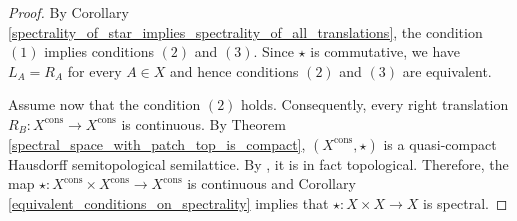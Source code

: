 \documentclass[10pt, reqno]{amsart}
\theoremstyle{plain}
\theoremstyle{definition}
\begin{document}
\begin{proof}
    By Corollary \ref{spectrality_of_star_implies_spectrality_of_all_translations}, the condition $(1)$ implies conditions $(2)$ and $(3)$. Since $\star$ is commutative, we have $L_A = R_A$ for every $A \in X$ and hence conditions $(2)$ and $(3)$ are equivalent. 

    Assume now that the condition $(2)$ holds. Consequently, every right translation $R_B: X^\mathrm{cons} \to X^\mathrm{cons}$ is continuous. By Theorem \ref{spectral_space_with_patch_top_is_compact}, $(X^\mathrm{cons}, \star)$ is a quasi-compact Hausdorff semitopological semilattice. By \cite[Theorem VII-4.8]{Gierz_Hofmann_Keimel_Lawson_Mislove_Scott_200}, it is in fact topological. Therefore, the map $\star: X^\mathrm{cons} \times X^\mathrm{cons} \to X^\mathrm{cons}$ is continuous and Corollary \ref{equivalent_conditions_on_spectrality} implies that $\star: X \times X \to X$ is spectral.
\end{proof}
\end{document}
